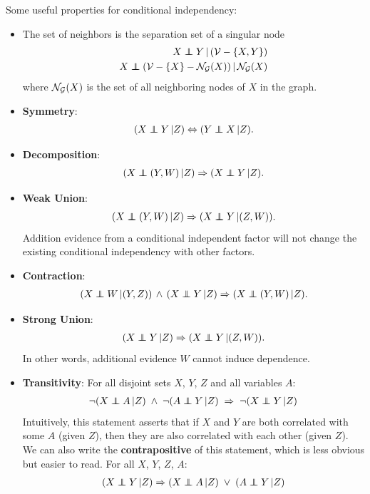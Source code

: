 \documentclass[11pt]{article}
\begin{document}
Some useful properties for conditional independency:
\begin{itemize}
\item The set of neighbors is the separation set of a singular node
\begin{align*}
X \indep Y \,|\,  (\cV - \set{X, Y}) \\
X \indep (\cV -\set{X} -\cN_{\cG}(X)) \, |\, \cN_{\cG}(X)
\end{align*} where ${\mathcal N}_{{\mathcal G}}(X)$ is the set of all neighboring nodes of $X$ in the graph.

\item \textbf{Symmetry}: 
\begin{align*}
(X \indep Y \,|  Z) \Leftrightarrow (Y  \indep X  \,| Z).  
\end{align*}

\item \textbf{Decomposition}: 
\begin{align}
(X \indep (Y, W) \,|  Z) \Rightarrow (X  \indep Y  \,| Z).  \label{eqn: decomp}
\end{align}

\item \textbf{Weak Union}: 
\begin{align}
(X \indep (Y, W) \,|  Z) \Rightarrow (X  \indep Y  \,| (Z, W)).  \label{eqn: weak_union}
\end{align} Addition evidence from a conditional independent factor will not change the existing conditional independency with other factors.

\item \textbf{Contraction}: 
\begin{align}
(X \indep W \,| (Y, Z))\, \land \, (X \indep Y \,|  Z)  \Rightarrow (X \indep (Y, W) \,|  Z) .  \label{eqn: contraction}
\end{align} 

\item \textbf{Strong Union}: 
\begin{align}
(X \indep Y \,|  Z) \Rightarrow (X  \indep Y  \,| (Z, W)).  \label{eqn: strong_union}
\end{align} In other words, additional evidence $W$ cannot induce dependence.

\item \textbf{Transitivity}: For all disjoint sets $X$, $Y$, $Z$ and all variables $A$:
\begin{align}
\neg (X \indep A \,|  Z) \; \land\; \neg (A \indep Y \,|  Z)\; \Rightarrow \;\neg (X \indep Y \,|  Z)  \label{eqn: transitivity}
\end{align} Intuitively, this statement asserts that if $X$ and $Y$ are both correlated with some $A$ (given $Z$), then they
are also correlated with each other (given $Z$). We can also write the \textbf{contrapositive} of this statement,
which is less obvious but easier to read. For all $X$, $Y$, $Z$, $A$:
\begin{align}
 (X \indep Y \,|  Z)  \Rightarrow (X \indep A \,|  Z)\;  \lor \; (A \indep Y \,|  Z)   \label{eqn: transitivity_counterpositive}
\end{align}
\end{itemize}
\newpage
\end{document}
